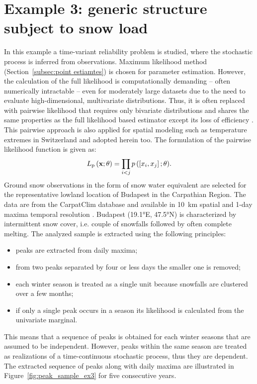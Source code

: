 \section{Example 3: generic structure subject to snow load}
\label{sec:copula_snow}

In this example a time-variant reliability problem is studied, where the stochastic process is inferred from observations. Maximum likelihood method (Section~\ref{subsec:point estiamtes}) is chosen for parameter estimation. However, the calculation of the full likelihood is computationally demanding -- often numerically intractable -- even for moderately large datasets due to the need to evaluate high-dimensional, multivariate distributions. Thus, it is often replaced with pairwise likelihood that requires only bivariate distributions and shares the same properties as the full likelihood based estimator except its loss of efficiency \citep{PadoanRibatetSisson2010}. This pairwise approach is also applied for spatial modeling such as temperature extremes in Switzerland \citep{Ribatet2012} and adopted herein too. The formulation of the pairwise likelihood function is given as:
\begin{equation}
	{L_{\mathrm{p}}}\left( {{\bf{x}};{\bf{\theta }}} \right) = \prod\limits_{i < j} {p\left( {\left[ {{x_i},{x_j}} \right];{\bf{\theta }}} \right)}.
\end{equation}
Ground snow observations in the form of snow water equivalent are selected for the representative lowland location of Budapest in the Carpathian Region. The data are from the CarpatClim database and available in 10~km spatial and 1-day maxima temporal resolution \citep{Szalai2013}. Budapest (19.1°E, 47.5°N) is characterized by intermittent snow cover, i.e. couple of snowfalls followed by often complete melting. The analyzed sample is extracted using the following principles:
\begin{itemize}
	\item peaks are extracted from daily maxima;
	\item from two peaks separated by four or less days the smaller one is removed;
	\item each winter season is treated as a single unit because snowfalls are clustered over a few months;
	\item if only a single peak occurs in a season its likelihood is calculated from the univariate marginal.
\end{itemize}
This means that a sequence of peaks is obtained for each winter seasons that are assumed to be independent. However, peaks within the same season are treated as realizations of a time-continuous stochastic process, thus they are dependent. The extracted sequence of peaks along with daily maxima are illustrated in Figure~\ref{fig:peak_sample_ex3} for five consecutive years.

